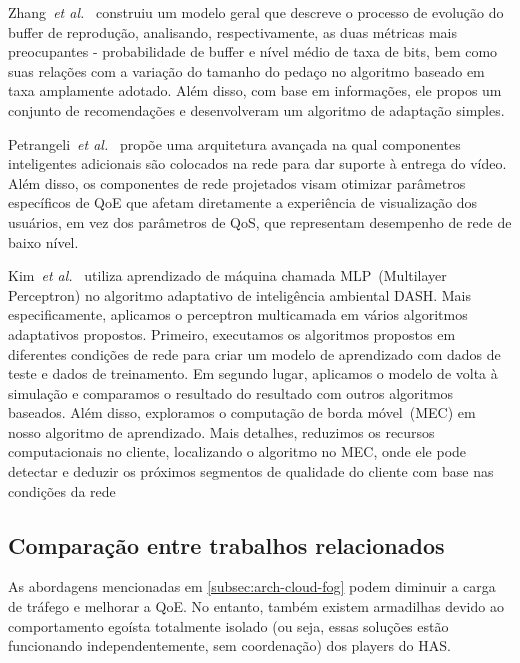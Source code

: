 Zhang~\textit{et al.}~\cite{zhangINFOCOM17} 
construiu um modelo geral que descreve o processo de evolução do buffer de reprodução, analisando, respectivamente, as duas métricas mais preocupantes - probabilidade de buffer e nível médio de taxa de bits, bem como suas relações com a variação do tamanho do pedaço no algoritmo baseado em taxa amplamente adotado. 
Além disso, com base em informações, ele propos um conjunto de recomendações e desenvolveram um algoritmo de adaptação simples.

Petrangeli~\textit{et al.}~\cite{petrangeli2019IM}
propõe uma arquitetura avançada na qual componentes inteligentes adicionais são colocados na rede para dar suporte à entrega do vídeo. Além disso, os componentes de rede projetados visam otimizar parâmetros específicos de QoE que afetam diretamente a experiência de visualização dos usuários, em vez dos parâmetros de QoS, que representam desempenho de rede de baixo nível.

Kim~\textit{et al.}~\cite{Kim2018}
utiliza aprendizado de máquina chamada MLP~(Multilayer Perceptron) no algoritmo adaptativo de inteligência ambiental DASH. Mais especificamente, aplicamos o perceptron multicamada em vários algoritmos adaptativos propostos. Primeiro, executamos os algoritmos propostos em diferentes condições de rede para criar um modelo de aprendizado com dados de teste e dados de treinamento. Em segundo lugar, aplicamos o modelo de volta à simulação e comparamos o resultado do resultado com outros algoritmos baseados. Além disso, exploramos o computação de borda móvel~(MEC) em nosso algoritmo de aprendizado. Mais detalhes, reduzimos os recursos computacionais no cliente, localizando o algoritmo no MEC, onde ele pode detectar e deduzir os próximos segmentos de qualidade do cliente com base nas condições da rede

\subsection{Comparação entre trabalhos relacionados}
\label{subsec:applications}

As abordagens mencionadas em \autoref{subsec:arch-cloud-fog} podem diminuir a carga de tráfego 
e melhorar a QoE. No entanto, também existem armadilhas devido ao comportamento egoísta totalmente isolado (ou seja, essas soluções estão funcionando independentemente, sem coordenação) dos players do HAS.

